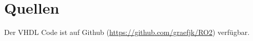\documentclass{scrartcl}
\begin{document}
\newpage
\section{Quellen}\label{sec:Quellen}
Der VHDL Code ist auf Github (\url{https://github.com/graefjk/RO2}) verfügbar.





\listoffigures
\listoftables
\end{document}
